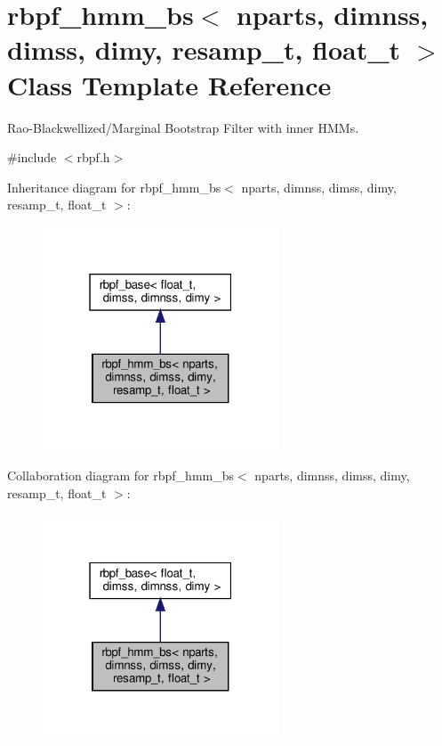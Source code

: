 \hypertarget{classrbpf__hmm__bs}{}\section{rbpf\+\_\+hmm\+\_\+bs$<$ nparts, dimnss, dimss, dimy, resamp\+\_\+t, float\+\_\+t $>$ Class Template Reference}
\label{classrbpf__hmm__bs}


Rao-\/\+Blackwellized/\+Marginal Bootstrap Filter with inner H\+M\+Ms.  




{\ttfamily \#include $<$rbpf.\+h$>$}



Inheritance diagram for rbpf\+\_\+hmm\+\_\+bs$<$ nparts, dimnss, dimss, dimy, resamp\+\_\+t, float\+\_\+t $>$\+:\nopagebreak
\begin{figure}[H]
\begin{center}
\leavevmode
\includegraphics[width=199pt]{classrbpf__hmm__bs__inherit__graph}
\end{center}
\end{figure}


Collaboration diagram for rbpf\+\_\+hmm\+\_\+bs$<$ nparts, dimnss, dimss, dimy, resamp\+\_\+t, float\+\_\+t $>$\+:\nopagebreak
\begin{figure}[H]
\begin{center}
\leavevmode
\includegraphics[width=199pt]{classrbpf__hmm__bs__coll__graph}
\end{center}
\end{figure}
